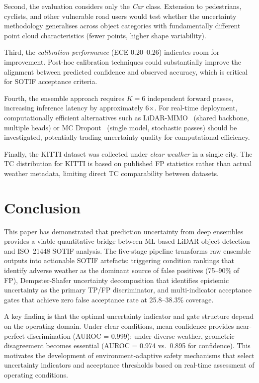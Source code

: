 \documentclass[conference]{IEEEtran}
\begin{document}
Second, the evaluation considers only the \emph{Car} class. Extension to pedestrians, cyclists, and other vulnerable road users would test whether the uncertainty methodology generalises across object categories with fundamentally different point cloud characteristics (fewer points, higher shape variability).

Third, the \emph{calibration performance} (ECE 0.20--0.26) indicates room for improvement. Post-hoc calibration techniques could substantially improve the alignment between predicted confidence and observed accuracy, which is critical for SOTIF acceptance criteria.

Fourth, the ensemble approach requires $K{=}6$ independent forward passes, increasing inference latency by approximately 6$\times$. For real-time deployment, computationally efficient alternatives such as LiDAR-MIMO~\cite{pitropov2022} (shared backbone, multiple heads) or MC Dropout~\cite{gal2016} (single model, stochastic passes) should be investigated, potentially trading uncertainty quality for computational efficiency.

Finally, the KITTI dataset was collected under \emph{clear weather} in a single city. The TC distribution for KITTI is based on published FP statistics rather than actual weather metadata, limiting direct TC comparability between datasets.


\section{Conclusion}

This paper has demonstrated that prediction uncertainty from deep ensembles provides a viable quantitative bridge between ML-based LiDAR object detection and ISO~21448 SOTIF analysis. The five-stage pipeline transforms raw ensemble outputs into actionable SOTIF artefacts: triggering condition rankings that identify adverse weather as the dominant source of false positives (75--90\% of FP), Dempster-Shafer uncertainty decomposition that identifies epistemic uncertainty as the primary TP/FP discriminator, and multi-indicator acceptance gates that achieve zero false acceptance rate at 25.8--38.3\% coverage.

A key finding is that the optimal uncertainty indicator and gate structure depend on the operating domain. Under clear conditions, mean confidence provides near-perfect discrimination (AUROC = 0.999); under diverse weather, geometric disagreement becomes essential (AUROC = 0.974 vs.\ 0.895 for confidence). This motivates the development of environment-adaptive safety mechanisms that select uncertainty indicators and acceptance thresholds based on real-time assessment of operating conditions.
\end{document}
